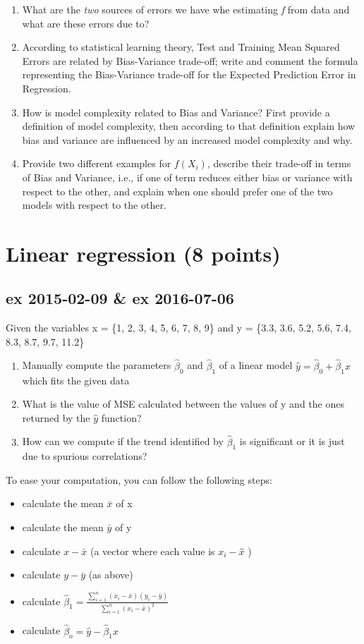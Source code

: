 \documentclass[a4paper,12pt,titlepage]{article} %
\begin{document}
\begin{enumerate}
\item What are the \textit{two} sources of errors we have whe estimating \textit{f} from data and what are these errors due to?
\item According to statistical learning theory, Test and Training Mean Squared Errors are related by Bias-Variance trade-off; write and comment the formula representing the Bias-Variance trade-off for the Expected Prediction Error in Regression.
\item How is model complexity related to Bias and Variance? First provide a definition of model complexity, then according to that definition explain how bias and variance are influenced by an increased model complexity and why.
\item Provide two different examples for $ f(X_{i}) $, describe their trade-off in terms of Bias and Variance, i.e., if one of term reduces either bias or variance with respect to the other, and explain when one should prefer one of the two models with respect to the other.
\end{enumerate}

\newpage
\section{Linear regression (8 points)}
\subsection{ex 2015-02-09 \& ex 2016-07-06}
Given the variables x = \{1, 2, 3, 4, 5, 6, 7, 8, 9\} and y = \{3.3, 3.6, 5.2, 5.6, 7.4, 8.3, 8.7, 9.7, 11.2\}
\begin{enumerate}
\item Manually compute the parameters $\hat{\beta}_{0} $ and $\hat{\beta}_{1} $ of a linear model $ \hat{y} = \hat{\beta}_{0} + \hat{\beta}_{1} x$ which fits the given data
\item What is the value of MSE calculated between the values of y and the ones returned by the $\hat{y}$ function?
\item How can we compute if the trend identified by $\hat{\beta}_{1}$ is significant or it is just due to spurious correlations?
\end{enumerate}
 
To ease your computation, you can follow the following steps:
\begin{itemize}
\item calculate the mean $\bar{x}$ of x
\item calculate the mean $\bar{y}$ of y
\item calculate $ x - \bar{x} $ (a vector where each value is $ x_{i} - \bar{x} $̄ )
\item calculate $ y - \bar{y} $ (as above)
\item calculate $ \hat{\beta}_{1} = \frac{\sum_{i=1}^{n} (x_{i}-\bar{x}) (y_{i}-\bar{y})}{ \sum_{i=1}^{n} (x_{i}-\bar{x})^{2} } $
\item calculate $ \hat{\beta}_{o} = \hat{y} - \hat{\beta}_{1} x $
\end{itemize}
\end{document}
